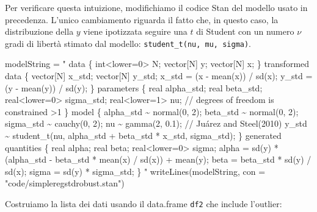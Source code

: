 \documentclass[
]{memoir}
\newenvironment{Shaded}{\begin{snugshade}}{\end{snugshade}}
\newcommand{\AttributeTok}[1]{\textcolor[rgb]{0.77,0.63,0.00}{#1}}
\newcommand{\FunctionTok}[1]{\textcolor[rgb]{0.00,0.00,0.00}{#1}}
\newcommand{\NormalTok}[1]{#1}
\newcommand{\OtherTok}[1]{\textcolor[rgb]{0.56,0.35,0.01}{#1}}
\newcommand{\SpecialCharTok}[1]{\textcolor[rgb]{0.00,0.00,0.00}{#1}}
\newcommand{\StringTok}[1]{\textcolor[rgb]{0.31,0.60,0.02}{#1}}
\begin{document}
Per verificare questa intuizione, modifichiamo il codice Stan del modello usato in precedenza. L'unico cambiamento riguarda il fatto che, in questo caso, la distribuzione della \(y\) viene ipotizzata seguire una \(t\) di Student con un numero \(\nu\) gradi di libertà stimato dal modello: \texttt{student\_t(nu,\ mu,\ sigma)}.

\begin{Shaded}
\begin{Highlighting}[]
\NormalTok{modelString }\OtherTok{=} \StringTok{"}
\StringTok{data \{}
\StringTok{  int\textless{}lower=0\textgreater{} N;}
\StringTok{  vector[N] y;}
\StringTok{  vector[N] x;}
\StringTok{\}}
\StringTok{transformed data \{}
\StringTok{  vector[N] x\_std;}
\StringTok{  vector[N] y\_std;}
\StringTok{  x\_std = (x {-} mean(x)) / sd(x);}
\StringTok{  y\_std = (y {-} mean(y)) / sd(y);}
\StringTok{\}}
\StringTok{parameters \{}
\StringTok{  real alpha\_std;}
\StringTok{  real beta\_std;}
\StringTok{  real\textless{}lower=0\textgreater{} sigma\_std;}
\StringTok{  real\textless{}lower=1\textgreater{} nu;    // degrees of freedom is constrained \textgreater{}1}
\StringTok{\}}
\StringTok{model \{}
\StringTok{  alpha\_std \textasciitilde{} normal(0, 2);}
\StringTok{  beta\_std \textasciitilde{} normal(0, 2);}
\StringTok{  sigma\_std \textasciitilde{} cauchy(0, 2);}
\StringTok{  nu \textasciitilde{} gamma(2, 0.1);   // Juárez and Steel(2010)}
\StringTok{  y\_std \textasciitilde{} student\_t(nu, alpha\_std + beta\_std * x\_std, sigma\_std);}
\StringTok{\}}
\StringTok{generated quantities \{}
\StringTok{  real alpha;}
\StringTok{  real beta;}
\StringTok{  real\textless{}lower=0\textgreater{} sigma;}
\StringTok{  alpha = sd(y) * (alpha\_std {-} beta\_std * mean(x) / sd(x))}
\StringTok{           + mean(y);}
\StringTok{  beta = beta\_std * sd(y) / sd(x);}
\StringTok{  sigma = sd(y) * sigma\_std;}
\StringTok{\}}
\StringTok{"}
\FunctionTok{writeLines}\NormalTok{(modelString, }\AttributeTok{con =} \StringTok{"code/simpleregstdrobust.stan"}\NormalTok{)}
\end{Highlighting}
\end{Shaded}

\noindent
Costruiamo la lista dei dati usando il data.frame \texttt{df2} che include l'outlier:

\begin{Shaded}
\end{Shaded}
\end{document}
